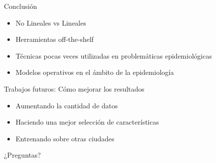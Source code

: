 \documentclass[10pt]{beamer}
\begin{document}
\begin{frame}{Conclusión}
  \begin{itemize}[<+->]
    \item No Lineales vs Lineales

    \item Herramientas off-the-shelf

    \item Técnicas pocas veces utilizadas en problemáticas epidemiológicas

    \item Modelos operativos en el ámbito de la epidemiología
  \end{itemize}
\end{frame}

\begin{frame}{Trabajos futuros: Cómo mejorar los resultados}
    \begin{itemize}[<+->]
    \item Aumentando la cantidad de datos
    \item Haciendo una mejor selección de características
    \item Entrenando sobre otras ciudades
    \end{itemize}
\end{frame}

\begin{frame}[standout]
  ¿Preguntas?
\end{frame}
\end{document}
